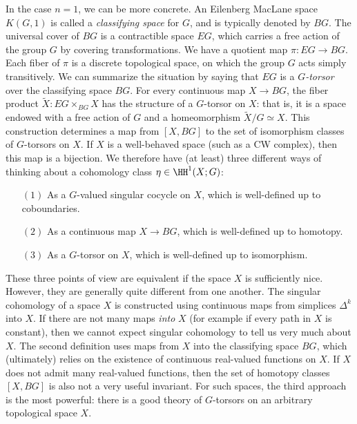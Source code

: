 In the case $n=1$, we can be more concrete. An Eilenberg MacLane space $K(G,1)$
is called a {\it classifying space} for $G$, and is typically denoted by $BG$. The universal cover
of $BG$ is a contractible space $EG$, which carries a free action of the group $G$ by covering transformations. We have a quotient map $\pi: EG \rightarrow BG$.
Each fiber of $\pi$ is a discrete topological space, on which the group $G$ acts simply transitively. We can summarize the situation by saying that $EG$ is a {\it $G$-torsor} over the classifying space $BG$.
For every continuous map $X \rightarrow BG$, the fiber product $\widetilde{X}: EG \times_{BG} X$ has the structure of a $G$-torsor on $X$: that is, it is a space endowed with a free action of $G$ and
a homeomorphism $\widetilde{X} / G \simeq X$. This construction determines a map
from $[X, BG]$ to the set of isomorphism classes of $G$-torsors on $X$. If $X$ is a well-behaved space (such as a CW complex), then this map is a bijection. We therefore have (at least) three different ways of thinking about a cohomology class $\eta \in \HH^{1}(X; G)$:
\begin{itemize}
\item[$(1)$] As a $G$-valued singular cocycle on $X$, which is well-defined up to coboundaries.
\item[$(2)$] As a continuous map $X \rightarrow BG$, which is well-defined up to homotopy.
\item[$(3)$] As a $G$-torsor on $X$, which is well-defined up to isomorphism.
\end{itemize}
These three points of view are equivalent if the space $X$ is sufficiently nice.
However, they are generally quite different from one another. The singular cohomology of a space $X$ is constructed using continuous maps from simplices $\Delta^k$ into $X$. If there are not many maps {\em into} $X$ (for example if every path in $X$ is constant), then we cannot expect singular cohomology to tell us very much about $X$. The second definition
uses maps from $X$ into the classifying space $BG$, which
(ultimately) relies on the existence of continuous real-valued
functions on $X$. If $X$ does not admit many real-valued
functions, then the set of homotopy classes $[X, BG]$ is also not a very useful invariant.
For such spaces, the third approach is the most powerful: there is a good theory of
$G$-torsors on an arbitrary topological space $X$. 

